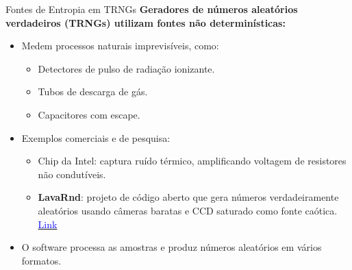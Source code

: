 \begin{frame}{Fontes de Entropia em TRNGs}
\textbf{Geradores de números aleatórios verdadeiros (TRNGs) utilizam fontes não determinísticas:}
\begin{itemize}
    \item Medem processos naturais imprevisíveis, como:
    \begin{itemize}
        \item Detectores de pulso de radiação ionizante.
        \item Tubos de descarga de gás.
        \item Capacitores com escape.
    \end{itemize}
    \item Exemplos comerciais e de pesquisa:
    \begin{itemize}
        \item Chip da Intel: captura ruído térmico, amplificando voltagem de resistores não condutíveis.
        \item \textbf{LavaRnd}: projeto de código aberto que gera números verdadeiramente aleatórios usando câmeras baratas e CCD saturado como fonte caótica. \href{http://www.lavarnd.org/}{\textcolor{blue}{Link}}
    \end{itemize}
    \item O software processa as amostras e produz números aleatórios em vários formatos.
\end{itemize}
\end{frame}

